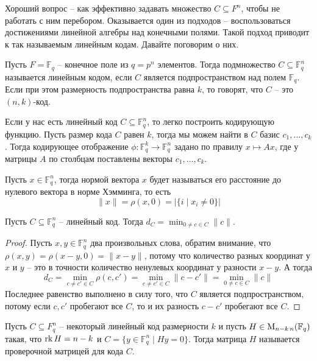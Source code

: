 Хороший вопрос -- как эффективно задавать множество $C\subseteq F^n$, чтобы не работать с ним перебором.
Оказывается один из подходов -- воспользоваться достижениями линейной алгебры над конечными полями.
Такой подход приводит к так называемым линейным кодам.
Давайте поговорим о них.

\begin{definition}
\label{def::LinearCode}
Пусть $F = \mathbb F_q$ -- конечное поле из $q = p^n$ элементов.
Тогда подмножество $C\subseteq \mathbb F_q^n$ называется линейным кодом, если $C$ является подпространством над полем $\mathbb F_q$.
Если при этом размерность подпространства равна $k$, то говорят, что $C$ -- это $(n, k)$-код.
\end{definition}

Если у нас есть линейный код $C\subseteq \mathbb F_q^n$, то легко построить кодирующую функцию.
Пусть размер кода $C$ равен $k$, тогда мы можем найти в $C$ базис $c_1,\ldots,c_k$.
Тогда кодирующее отображение $\phi\colon \mathbb F_q^k \to \mathbb F_q^n$ задано по правилу $x \mapsto Ax$, где у матрицы $A$ по столбцам поставлены векторы $c_1,\ldots,c_k$.

\begin{definition}
\label{def::HammingNorm}
Пусть $x\in \mathbb F_q^n$, тогда нормой вектора $x$ будет называться его расстояние до нулевого вектора в норме Хэмминга, то есть
\[
\|x\| = \rho(x, 0) = |\{i \mid x_i \neq 0\}|
\]
\end{definition}

\begin{claim}
\label{claim::LinearCodeMinDist}
Пусть $C\subseteq \mathbb F_q^n$ -- линейный код.
Тогда $d_C = \min_{0\neq c \in C}\|c\|$.
\end{claim}
\begin{proof}
Пусть $x,y\in \mathbb F_q^n$ два произвольных слова, обратим внимание, что $\rho(x,y) = \rho(x - y, 0) = \|x - y\|$, потому что количество разных координат у $x$ и $y$ -- это в точности количество ненулевых координат у разности $x-y$.
А тогда
\[
d_C = \min_{c \neq c'\in C}\rho(c,c') = \min_{c\neq c' \in C}\|c-c'\| = \min_{0\neq c\in C}\|c\|
\]
Последнее равенство выполнено в силу того, что $C$ является подпространством, потому если $c,c'$ пробегают все $C$, то и их разность $c-c'$ пробегают все $C$.
\end{proof}

\begin{definition}
\label{def::CodeMatrix}
Пусть $C\subseteq F_q^n$ -- некоторый линейный код размерности $k$ и пусть $H\in \MatrixFDim{\mathbb F_q}{n-k}{n}$ такая, что $\rk H = n - k$ и $C = \{y\in \mathbb F_q^n \mid Hy = 0\}$.
Тогда матрица $H$ называется проверочной матрицей для кода $C$.
\end{definition}

